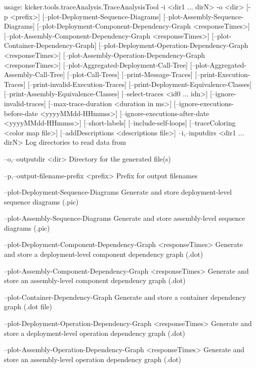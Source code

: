 usage: kicker.tools.traceAnalysis.TraceAnalysisTool -i <dir1 ... dirN> -o <dir>
       [-p <prefix>] [--plot-Deployment-Sequence-Diagrams]
       [--plot-Assembly-Sequence-Diagrams]
       [--plot-Deployment-Component-Dependency-Graph <responseTimes>]
       [--plot-Assembly-Component-Dependency-Graph <responseTimes>]
       [--plot-Container-Dependency-Graph]
       [--plot-Deployment-Operation-Dependency-Graph <responseTimes>]
       [--plot-Assembly-Operation-Dependency-Graph <responseTimes>]
       [--plot-Aggregated-Deployment-Call-Tree]
       [--plot-Aggregated-Assembly-Call-Tree] [--plot-Call-Trees]
       [--print-Message-Traces] [--print-Execution-Traces]
       [--print-invalid-Execution-Traces]
       [--print-Deployment-Equivalence-Classes]
       [--print-Assembly-Equivalence-Classes] [--select-traces <id0 ... idn>]
       [--ignore-invalid-traces] [--max-trace-duration <duration in ms>]
       [--ignore-executions-before-date <yyyyMMdd-HHmmss>]
       [--ignore-executions-after-date <yyyyMMdd-HHmmss>] [--short-labels]
       [--include-self-loops] [--traceColoring <color map file>]
       [--addDescriptions <descriptions file>]
 --i,--inputdirs <dir1 ... dirN>
        Log directories to read data from

 --o,--outputdir <dir>
        Directory for the generated file(s)

 --p,--output-filename-prefix <prefix>
        Prefix for output filenames
        

    --plot-Deployment-Sequence-Diagrams
        Generate and store deployment-level sequence diagrams (.pic)

    --plot-Assembly-Sequence-Diagrams
        Generate and store assembly-level sequence diagrams (.pic)

    --plot-Deployment-Component-Dependency-Graph <responseTimes>
        Generate and store a deployment-level component dependency graph (.dot)

    --plot-Assembly-Component-Dependency-Graph <responseTimes>
        Generate and store an assembly-level component dependency graph (.dot)

    --plot-Container-Dependency-Graph
        Generate and store a container dependency graph (.dot file)

    --plot-Deployment-Operation-Dependency-Graph <responseTimes>
        Generate and store a deployment-level operation dependency graph (.dot)

    --plot-Assembly-Operation-Dependency-Graph <responseTimes>
        Generate and store an assembly-level operation dependency graph (.dot)

